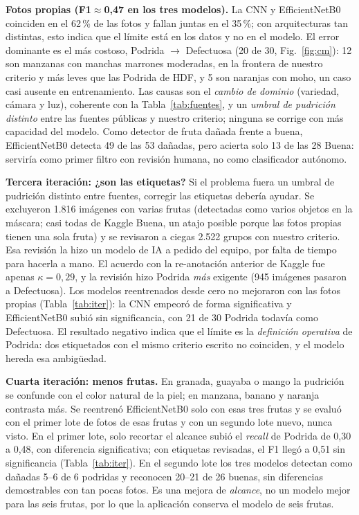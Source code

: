\documentclass[conference,a4paper]{IEEEtran}
\begin{document}
\textbf{Fotos propias (F1$\approx$0,47 en los tres modelos).} La CNN y EfficientNetB0 coinciden en el
62\,\% de las fotos y fallan juntas en el 35\,\%; con arquitecturas tan distintas, esto indica que el
límite está en los datos y no en el modelo. El error dominante es el más costoso, Podrida
$\rightarrow$ Defectuosa (20 de 30, Fig.~\ref{fig:cm}): 12 son manzanas con manchas marrones moderadas,
en la frontera de nuestro criterio y más leves que las Podrida de HDF, y 5 son naranjas con moho, un
caso casi ausente en entrenamiento. Las causas son el \emph{cambio de dominio} (variedad, cámara y luz),
coherente con la Tabla~\ref{tab:fuentes}, y un \emph{umbral de pudrición distinto} entre las fuentes
públicas y nuestro criterio; ninguna se corrige con más capacidad del modelo. Como detector de fruta
dañada frente a buena, EfficientNetB0 detecta 49 de las 53 dañadas, pero acierta solo 13 de las 28
Buena: serviría como primer filtro con revisión humana, no como clasificador autónomo.

\textbf{Tercera iteración: ¿son las etiquetas?} Si el problema fuera un umbral de pudrición distinto
entre fuentes, corregir las etiquetas debería ayudar. Se excluyeron 1.816 imágenes con varias frutas
(detectadas como varios objetos en la máscara; casi todas de Kaggle Buena, un atajo posible porque las
fotos propias tienen una sola fruta) y se revisaron a ciegas 2.522 grupos con nuestro criterio. Esa
revisión la hizo un modelo de IA a pedido del equipo, por falta de tiempo para hacerla a mano. El
acuerdo con la re-anotación anterior de Kaggle fue apenas $\kappa=0{,}29$, y la revisión hizo Podrida
\emph{más} exigente (945 imágenes pasaron a Defectuosa). Los modelos reentrenados desde cero no
mejoraron con las fotos propias (Tabla~\ref{tab:iter}): la CNN empeoró de forma significativa y
EfficientNetB0 subió sin significancia, con 21 de 30 Podrida todavía como Defectuosa. El resultado
negativo indica que el límite es la \emph{definición operativa} de Podrida: dos etiquetados con el
mismo criterio escrito no coinciden, y el modelo hereda esa ambigüedad.

\textbf{Cuarta iteración: menos frutas.} En granada, guayaba o mango la pudrición se confunde con el
color natural de la piel; en manzana, banano y naranja contrasta más. Se reentrenó EfficientNetB0 solo
con esas tres frutas y se evaluó con el primer lote de fotos de esas frutas y con un segundo lote nuevo,
nunca visto. En el primer lote, solo recortar el alcance subió el \emph{recall} de Podrida de 0,30 a
0,48, con diferencia significativa; con etiquetas revisadas, el F1 llegó a 0,51 sin significancia
(Tabla~\ref{tab:iter}). En el segundo lote los tres modelos detectan como dañadas 5--6 de 6 podridas y
reconocen 20--21 de 26 buenas, sin diferencias demostrables con tan pocas fotos. Es una mejora de
\emph{alcance}, no un modelo mejor para las seis frutas, por lo que la aplicación conserva el modelo
de seis frutas.
\end{document}
